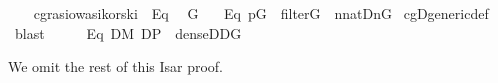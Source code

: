 \begin{isabelle}

\ \ \isamarkupfalse%
\ cg{\isachardot}rasiowa{\isacharunderscore}sikorski\ \ Eq{}\ \isamarkupfalse%
\ G\ \ \isanewline
  \ Eq{}{\isacharcolon}\ {\isachardoublequoteopen}p{\isasymin}G\ {\isasymand}\ filter{\isacharparenleft}G{\isacharparenright}\ {\isasymand}\ {\isacharparenleft}{\isasymforall}n{\isasymin}nat{\isachardot}{\isacharparenleft}{\isacharquery}D{\isacharbackquote}n{\isacharparenright}{\isasyminter}G{\isasymnoteq}{}{\isacharparenright}{\isachardoublequoteclose}\isanewline
 \isamarkupfalse%
\ cg{\isachardot}D{\isacharunderscore}generic{\isacharunderscore}def\ \isamarkupfalse%
\ blast\isanewline
\ \ \isamarkupfalse%
\ \isamarkupfalse%
\isanewline
  \ Eq{}{\isacharcolon}\ {\isachardoublequoteopen}{\isacharparenleft}{\isasymforall}D{\isasymin}M{\isachardot}\ D{\isasymsubseteq}P\ {\isasymand}\ dense{\isacharparenleft}D{\isacharparenright}{\isasymlongrightarrow}D{\isasyminter}G{\isasymnoteq}{}{\isacharparenright}{\isachardoublequoteclose}
\end{isabelle}

\noindent We omit the rest of this Isar proof.

